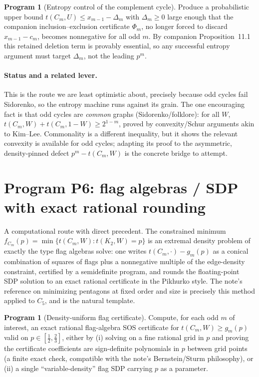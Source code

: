 \documentclass[11pt]{article}
\theoremstyle{definition}
\newtheorem{program}[theorem]{Program}
\newcommand{\1}{\mathbf{1}}
\begin{document}
\begin{program}[Entropy control of the complement cycle]\label{prog:entropy}
Produce a probabilistic upper bound $t(C_m,U)\le x_{m-1}-\Delta_m$ with
$\Delta_m\ge0$ large enough that the companion inclusion--exclusion certificate
$\Phi_m$, no longer forced to discard $x_{m-1}-c_m$, becomes nonnegative for all
odd $m$. By companion Proposition~11.1 this retained deletion term is provably
essential, so any successful entropy argument must target $\Delta_m$, not the
leading $p^m$.
\end{program}

\paragraph{Status and a related lever.}
This is the route we are least optimistic about, precisely because odd cycles
fail Sidorenko, so the entropy machine runs against its grain. The one encouraging
fact is that odd cycles are \emph{common} graphs (Sidorenko/folklore): for all
$W$, $t(C_m,W)+t(C_m,1-W)\ge 2^{1-m}$, proved by convexity/Schur arguments akin
to Kim--Lee. Commonality is a different inequality, but it shows the relevant
convexity is available for odd cycles; adapting its proof to the asymmetric,
density-pinned defect $p^m-t(C_m,W)$ is the concrete bridge to attempt.

\section{Program P6: flag algebras / SDP with exact rational rounding}
\label{sec:flag}

A computational route with direct precedent. The constrained minimum
$f_{C_m}(p)=\min\{t(C_m,W):t(K_2,W)=p\}$ is an extremal density problem of exactly
the type flag algebras solve: one writes $t(C_m,\cdot)-g_m(p)$ as a conical
combination of squares of flags plus a nonnegative multiple of the edge-density
constraint, certified by a semidefinite program, and rounds the floating-point
SDP solution to an exact rational certificate in the Pikhurko style. The note's
reference on minimizing pentagons at fixed order and size is precisely this
method applied to $C_5$, and is the natural template.

\begin{program}[Density-uniform flag certificate]\label{prog:flag}
Compute, for each odd $m$ of interest, an exact rational flag-algebra SOS
certificate for $t(C_m,W)\ge g_m(p)$ valid on $p\in[\tfrac12,\tfrac23]$, either by
(i) solving on a fine rational grid in $p$ and proving the certificate
coefficients are sign-definite polynomials in $p$ between grid points (a finite
exact check, compatible with the note's Bernstein/Sturm philosophy), or (ii) a
single ``variable-density'' flag SDP carrying $p$ as a parameter.
\end{program}
\end{document}
